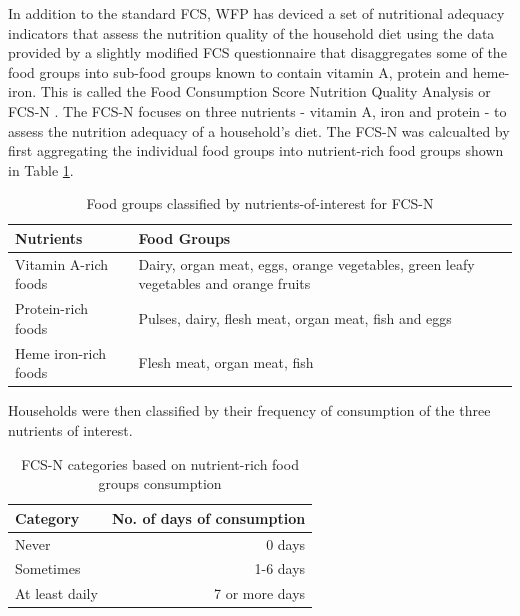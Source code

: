 \documentclass[12pt,a4paper]{article}
\begin{document}
In addition to the standard FCS, WFP has deviced a set of nutritional adequacy indicators that assess the nutrition quality of the household diet using the data provided by a slightly modified FCS questionnaire that disaggregates some of the food groups into sub-food groups known to contain vitamin A, protein and heme-iron. This is called the Food Consumption Score Nutrition Quality Analysis or FCS-N \citep{WorldFoodProgramme:2015tn}. The FCS-N focuses on three nutrients - vitamin A, iron and protein - to assess the nutrition adequacy of a household's diet. The FCS-N was calcualted by first aggregating the individual food groups into nutrient-rich food groups shown in Table \ref{tab:fcs3}.

\begin{table}[H]

\caption{\label{tab:fcs3}Food groups classified by nutrients-of-interest for FCS-N}
\centering
\begin{tabular}[t]{l>{\raggedright\arraybackslash}p{8cm}}
\toprule
\textbf{Nutrients} & \textbf{Food Groups}\\
\midrule
\rowcolor{gray!6}  Vitamin A-rich foods & Dairy, organ meat, eggs, orange vegetables, green leafy vegetables and orange fruits\\
Protein-rich foods & Pulses, dairy, flesh meat, organ meat, fish and eggs\\
\rowcolor{gray!6}  Heme iron-rich foods & Flesh meat, organ meat, fish\\
\bottomrule
\end{tabular}
\end{table}

Households were then classified by their frequency of consumption of the three nutrients of interest.

\begin{table}[H]

\caption{\label{tab:fcs4}FCS-N categories based on nutrient-rich food groups consumption}
\centering
\begin{tabular}[t]{lr}
\toprule
\textbf{Category} & \textbf{No. of days of consumption}\\
\midrule
\rowcolor{gray!6}  Never & 0 days\\
Sometimes & 1-6 days\\
\rowcolor{gray!6}  At least daily & 7 or more days\\
\bottomrule
\end{tabular}
\end{table}
\end{document}
